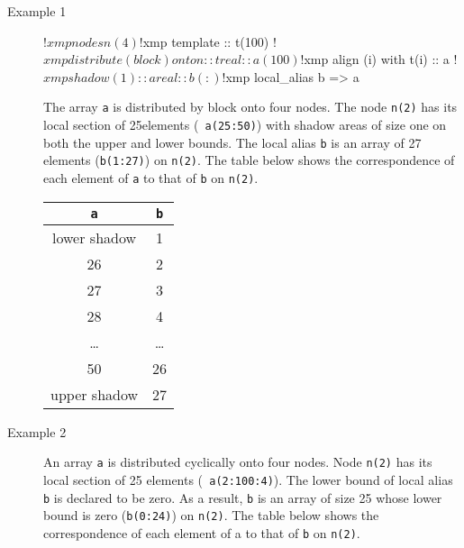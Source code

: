 \begin{description}

\item[Example 1]
\hspace{\hsize}

\begin{XFexample}
!$xmp nodes n(4)
!$xmp template :: t(100)
!$xmp distribute (block) onto n :: t

      real :: a(100)
!$xmp align (i) with t(i) :: a
!$xmp shadow (1) :: a

      real :: b(:)
!$xmp local_alias b => a
\end{XFexample}

The array {\tt a} is distributed by block onto four nodes.
The node {\tt n(2)} has its local section of 25elements ({\tt
a(25:50)}) with shadow areas of size one on both the upper and lower 
bounds. The local alias {\tt b} is an array of 27 elements
({\tt b(1:27)}) on {\tt n(2)}. The table below shows the correspondence
of each element of {\tt a} to that of {\tt b} on {\tt n(2)}.

\begin{center}
\begin{tabular}{|c|c|}\hline
{\tt a}      & {\tt b} \\ \hline\hline
lower shadow & 1       \\ \hline
26           & 2       \\ \hline
27           & 3       \\ \hline
28           & 4       \\ \hline
\dots        & \dots   \\ \hline
50           & 26      \\ \hline
upper shadow & 27      \\ \hline
\end{tabular}
\end{center}

\item[Example 2]
\hspace{\hsize}

An array {\tt a} is distributed cyclically onto four nodes.
Node {\tt n(2)} has its local section of 25 elements ({\tt
a(2:100:4)}).
The lower bound of local alias {\tt b} is declared to
be zero. As a result, {\tt b} is an array of size 25 whose lower
bound is zero ({\tt b(0:24)}) on {\tt n(2)}. The table below shows the
correspondence of each element of a to that of {\tt b} on {\tt n(2)}.


\end{description}
